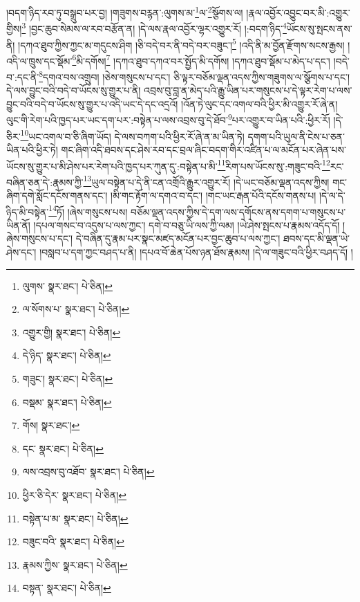 །བདག་ཉིད་རབ་ཏུ་བསྒྲུབ་པར་བྱ། །གཟུགས་བརྙན་:ལུགས་མ་\footnote{ལུགས་  སྣར་ཐང་།  པེ་ཅིན། }ལ་\footnote{ལ་སོགས་པ་  སྣར་ཐང་།  པེ་ཅིན། }སྩོགས་ལ། །རྣལ་འབྱོར་འབྱུང་བར་མི་:འགྱུར་གྱིས།\footnote{འགྱུར་གྱི།  སྣར་ཐང་།  པེ་ཅིན། } །བྱང་ཆུབ་སེམས་ལ་རབ་བརྩོན་ན། །དེ་ལས་རྣལ་འབྱོར་ལྷར་འགྱུར་རོ། །:བདག་ཉིད་\footnote{དེ་ཉིད་  སྣར་ཐང་།  པེ་ཅིན། }ཡོངས་སུ་སྤངས་ནས་ནི། །དཀའ་ཐུབ་ཀྱིས་ཀྱང་མ་གདུངས་ཤིག །ཅི་བདེ་བར་ནི་བདེ་བར་བཟུང་།\footnote{གཟུང་།  སྣར་ཐང་།  པེ་ཅིན། } །འདི་ནི་མ་བྱོན་རྫོགས་སངས་རྒྱས། །འདི་ལ་ཁྲུས་དང་སྡོམ་\footnote{བསྡམ་  སྣར་ཐང་།  པེ་ཅིན། }མི་དགོས།\footnote{གོས།  སྣར་ཐང་། } །དཀའ་ཐུབ་དཀའ་བར་སྤྱོད་མི་དགོས། །དཀའ་ཐུབ་སྡོམ་པ་མེད་པ་དང་། །བདེ་བ་:དང་ནི་\footnote{དང་  སྣར་ཐང་།  པེ་ཅིན། }དགའ་བས་འགྲུབ། །ཅེས་གསུངས་པ་དང་། ཅི་ལྟར་བཅོམ་ལྡན་འདས་ཀྱིས་གཟུགས་ལ་སྩོགས་པ་དང་། དེ་ལས་བྱུང་བའི་བདེ་བ་ཡོངས་སུ་གྱུར་པ་ནི། འབྲས་བུ་བླ་ན་མེད་པའི་རྒྱུ་ཡིན་པར་གསུངས་པ་དེ་ལྟར་རེག་པ་ལས་བྱུང་བའི་བདེ་བ་ཡོངས་སུ་གྱུར་པ་འདི་ཡང་དེ་དང་འདྲའོ། །འོན་ཏེ་ལུང་དང་འགལ་བའི་ཕྱིར་མི་འགྱུར་རོ་ཞེ་ན། ལུང་གི་རེག་པའི་ཁྱད་པར་ཡང་དག་པར་:བསྟེན་པ་ལས་འབྲས་བུ་དེ་ཐོབ་\footnote{ལས་འབྲས་བུ་འཐོབ་  སྣར་ཐང་།  པེ་ཅིན། }པར་འགྱུར་བ་ཡིན་པའི་:ཕྱིར་རོ། །དེ་ཅིར་\footnote{ཕྱིར་ཅི་དེར་  སྣར་ཐང་།  པེ་ཅིན། }ཡང་འགལ་བ་ཅི་ཞིག་ཡོད། དེ་ལས་བཀག་པའི་ཕྱིར་རོ་ཞེ་ན་མ་ཡིན་ཏེ། དགག་པའི་ཡུལ་ནི་ངེས་པ་ཅན་ཡིན་པའི་ཕྱིར་ཏེ། གང་ཞིག་འདི་ཐབས་དང་ཤེས་རབ་དང་བྲལ་ཞིང་བདག་གིར་འཛིན་པ་ལ་མངོན་པར་ཞེན་པས་ཡོངས་སུ་གྱུར་པ་མི་ཤེས་པར་རེག་པའི་ཁྱད་པར་ཀུན་དུ་:བསྟེན་པ་མི་\footnote{བསྟེན་པ་མ་  སྣར་ཐང་།  པེ་ཅིན། }རིག་པས་ཡོངས་སུ་:གཟུང་བའི་\footnote{བཟུང་བའི་  སྣར་ཐང་།  པེ་ཅིན། }རང་བཞིན་ཅན་དེ་:རྣམས་ཀྱི་\footnote{རྣམས་ཀྱིས་  སྣར་ཐང་།  པེ་ཅིན། }ཡུལ་བསྟེན་པ་དེ་ནི་ངན་འགྲོའི་རྒྱུར་འགྱུར་རོ། །དེ་ཡང་བཅོམ་ལྡན་འདས་ཀྱིས། གང་ཞིག་དགེ་སློང་དངོས་གནས་དང་། །མི་གང་རྟོག་ལ་དགའ་བ་དང་། །གང་ཡང་རྒན་པོའི་དངོས་གནས་པ། །དེ་ལ་དེ་ཉིད་མི་བསྟེན་\footnote{བསྟན་  སྣར་ཐང་།  པེ་ཅིན། }ཏོ། །ཞེས་གསུངས་པས། བཅོམ་ལྡན་འདས་ཀྱིས་དེ་དག་ལས་དགོངས་ནས་དགག་པ་གསུངས་པ་ཡིན་ནོ། །དཔལ་གསང་བ་འདུས་པ་ལས་ཀྱང་། དགེ་བ་བཅུ་ཡི་ལས་ཀྱི་ལམ། །ཡེ་ཤེས་སྤངས་པ་རྣམས་འདོད་དོ། །ཞེས་གསུངས་པ་དང་། དེ་བཞིན་དུ་རྣམ་པར་སྣང་མཛད་མངོན་པར་བྱང་ཆུབ་པ་ལས་ཀྱང་། ཐབས་དང་མི་ལྡན་ཡེ་ཤེས་དང་། །བསླབ་པ་དག་ཀྱང་བཤད་པ་ནི། །དཔའ་བོ་ཆེན་པོས་ཉན་ཐོས་རྣམས། །དེ་ལ་གཟུང་བའི་ཕྱིར་བཤད་དོ། །
